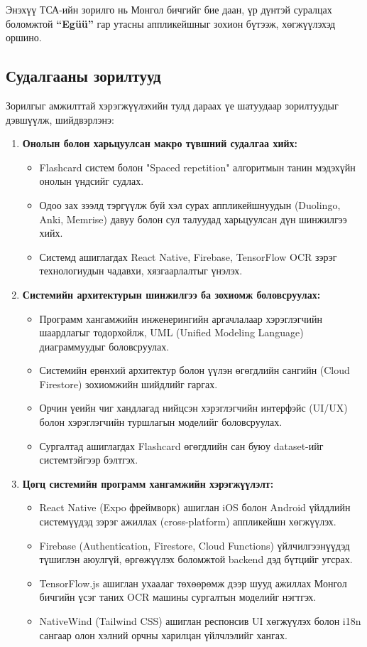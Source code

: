 Энэхүү ТСА-ийн зорилго нь Монгол бичгийг бие даан, үр дүнтэй суралцах боломжтой \textbf{``Egüü''} гар утасны аппликейшныг зохион бүтээж, хөгжүүлэхэд оршино.

\subsection{Судалгааны зорилтууд}
\label{subsec:tasks}

Зорилгыг амжилттай хэрэгжүүлэхийн тулд дараах үе шатуудаар зорилтуудыг дэвшүүлж, шийдвэрлэнэ:

\begin{enumerate}
    \item \textbf{Онолын болон харьцуулсан макро түвшний судалгаа хийх:}
    \begin{itemize}
        \item Flashcard систем болон "Spaced repetition" алгоритмын танин мэдэхүйн онолын үндсийг судлах.
        \item Одоо зах зээлд тэргүүлж буй хэл сурах аппликейшнуудын (Duolingo, Anki, Memrise) давуу болон сул талуудад харьцуулсан дүн шинжилгээ хийх.
        \item Системд ашиглагдах React Native, Firebase, TensorFlow OCR зэрэг технологиудын чадавхи, хязгаарлалтыг үнэлэх.
    \end{itemize}
    
    \item \textbf{Системийн архитектурын шинжилгээ ба зохиомж боловсруулах:}
    \begin{itemize}
        \item Программ хангамжийн инженерингийн аргачлалаар хэрэглэгчийн шаардлагыг тодорхойлж, UML (Unified Modeling Language) диаграммуудыг боловсруулах.
        \item Системийн ерөнхий архитектур болон үүлэн өгөгдлийн сангийн (Cloud Firestore) зохиомжийн шийдлийг гаргах.
        \item Орчин үеийн чиг хандлагад нийцсэн хэрэглэгчийн интерфэйс (UI/UX) болон хэрэглэгчийн туршлагын моделийг боловсруулах.
        \item Сургалтад ашиглагдах Flashcard өгөгдлийн сан буюу dataset-ийг системтэйгээр бэлтгэх.
    \end{itemize}
    
    \item \textbf{Цогц системийн программ хангамжийн хэрэгжүүлэлт:}
    \begin{itemize}
        \item React Native (Expo фреймворк) ашиглан iOS болон Android үйлдлийн системүүдэд зэрэг ажиллах (cross-platform) аппликейшн хөгжүүлэх.
        \item Firebase (Authentication, Firestore, Cloud Functions) үйлчилгээнүүдэд түшиглэн аюулгүй, өргөжүүлэх боломжтой backend дэд бүтцийг угсрах.
        \item TensorFlow.js ашиглан ухаалаг төхөөрөмж дээр шууд ажиллах Монгол бичгийн үсэг таних OCR машины сургалтын моделийг нэгтгэх.
        \item NativeWind (Tailwind CSS) ашиглан респонсив UI хөгжүүлэх болон i18n сангаар олон хэлний орчны харилцан үйлчлэлийг хангах.
    \end{itemize}
    

\end{enumerate}
